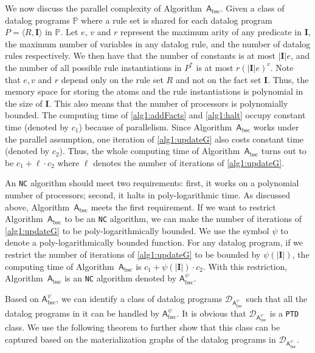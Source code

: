 We now discuss the parallel complexity of Algorithm~$\mathsf{A}_{\text{bsc}}$.
Given a class of datalog programs $\mathbb{P}$ where
a rule set is shared for each datalog program $P=\langle R, \textbf{I}\rangle$ in $\mathbb{P}$.
Let $e$, $v$ and $r$ represent the maximum arity of any predicate in $\textbf{I}$, the maximum number of variables
in any datalog rule, and the number of datalog rules respectively.
We then have that the number of
constants is at most $|\textbf{I}|e$, and the number of all possible rule instantiations in $P^*$
is at most $r(|\textbf{I}|e)^v$.
Note that $e, v$ and $r$ depend only on the rule set $R$ and not on the fact set $\textbf{I}$.
Thus, the memory space for storing the atoms and the rule instantiations is polynomial in the size of $\textbf{I}$.
This also means that the number of processors is polynomially bounded.
The computing time of \ref{alg1:addFacts} and \ref{alg1:halt} occupy constant time (denoted by $c_1$) because of parallelism.
Since Algorithm~$\mathsf{A}_{\text{bsc}}$ works under the parallel assumption, one iteration of
\ref{alg1:updateG} also costs constant time (denoted by $c_2$). Thus,
the whole computing time of Algorithm~$\mathsf{A}_{\text{bsc}}$ turns out to be $c_1+\ell\cdot c_2$
where $\ell$ denotes the number of iterations of \ref{alg1:updateG}.

An \texttt{NC} algorithm should meet two requirements: first,
it works on a polynomial number of processors; second, it halts in poly-logarithmic time.
As discussed above, Algorithm~$\mathsf{A}_{\text{bsc}}$ meets the first requirement.
If we want to restrict Algorithm~$\mathsf{A}_{\text{bsc}}$ to be an \texttt{NC} algorithm,
we can make the number of iterations of \ref{alg1:updateG} to be poly-logarithmically bounded.
We use the symbol $\psi$ to denote a poly-logarithmically bounded function.
For any datalog program, if we restrict the number of iterations of
\ref{alg1:updateG} to be bounded by $\psi(|\textbf{I}|)$,
the computing time of Algorithm~$\mathsf{A}_{\text{bsc}}$
is $c_1+\psi(|\textbf{I}|)\cdot c_2$. With this restriction, Algorithm~$\mathsf{A}_{\text{bsc}}$ is an \texttt{NC} algorithm denoted by
$\mathsf{A}_{\text{bsc}}^{\psi}$.

Based on $\mathsf{A}_{\text{bsc}}^{\psi}$, we can identify a class of datalog programs
$\mathcal{D}_{\mathsf{A}_{\text{bsc}}^{\psi}}$ such that all the datalog programs in it can be handled
by $\mathsf{A}_{\text{bsc}}^{\psi}$.
It is obvious that $\mathcal{D}_{\mathsf{A}_{\text{bsc}}^{\psi}}$ is a \texttt{PTD} class.
We use the following theorem to further show that this class can be captured based on
the materialization graphs of the datalog programs in $\mathcal{D}_{\mathsf{A}_{\text{bsc}}^{\psi}}$.

